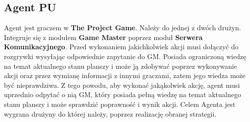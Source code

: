 \documentclass[../Dokumentacja.tex]{subfiles}
\begin{document}
\subsection{Agent PU}
Agent jest graczem w \textbf{The Project Game}. Należy do jednej z dwóch drużyn. Integruje się z modułem \textbf{Game Master} poprzez moduł \textbf{Serwera Komunikacyjnego}. Przed wykonaniem jakichkolwiek akcji musi dołączyć do rozgrywki wysyłając odpowiednie zapytanie do GM. Posiada ograniczoną wiedzę na temat aktualnego stanu planszy i może ją zdobywać poprzez wykonywanie akcji oraz przez wymianę informacji z innymi graczami, zatem jego wiedza może być nieprawdziwa. Z tego powodu, aby wykonać jakąkolwiek akcję, agent musi uprzednio odpytać o nią GM, który posiada pełną wiedzę na temat aktualnego stanu planszy i może sprawdzić poprawność i wynik akcji. Celem Agenta jest wygrana drużyny do której należy, poprzez realizację obranej strategii.

\end{document}
